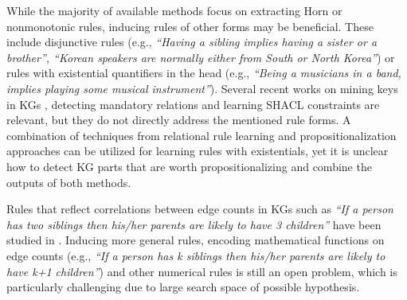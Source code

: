 While the majority of available methods focus on extracting Horn or nonmonotonic rules, inducing rules of other forms may be beneficial. These include %
disjunctive rules
(e.g., \emph{``Having a sibling implies having a sister or a brother'', ``Korean speakers are normally either from South or North Korea''})
 or rules with existential quantifiers in the head (e.g., \emph{``Being a musicians in a band, implies  playing some musical instrument''}).
Several recent works on mining keys in KGs \cite{vickey,DBLP:conf/www/LajusS18}, detecting mandatory relations \cite{DBLP:conf/www/LajusS18} and learning SHACL constraints \cite{shacl} are relevant, but they do not directly address the mentioned rule forms. A combination of techniques from relational rule learning \cite{DBLP:books/daglib/0021868} and propositionalization approaches \cite{propos} can be utilized for learning rules with existentials, yet it is unclear how to detect KG parts that are worth propositionalizing and combine the outputs of both methods.  %

Rules that reflect correlations between edge counts in KGs such as \emph{``If a person has two siblings then his/her parents are likely to have 3 children''} have been studied in \cite{carl}. Inducing more general rules, encoding mathematical functions on edge counts (e.g.,  \emph{``If a person has k siblings then his/her parents are likely to have k+1 children''}) and other numerical rules is still an open problem, which is particularly challenging due to large search space of possible hypothesis.

